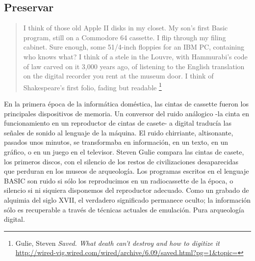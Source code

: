\documentclass[12pt, a4paper,twoside]{book}
\begin{document}
\subsection{Preservar}

\begin{quote}
I think of those old Apple II disks in my closet. My son's first
Basic program, still on a Commodore 64 cassette. I flip through my
filing cabinet. Sure enough, some 51/4-inch floppies for an IBM PC,
containing who knows what? I think of a stele in the Louvre, with
Hammurabi's code of law carved on it 3,000 years ago, of listening
to the English translation on the digital recorder you rent at the
museum door. I think of Shakespeare's first folio, fading but
readable%
\footnote{Gulie, Steven
\emph{Saved. What death can't destroy and how to digitize it}
\href{http://wired-vig.wired.com/wired/archive/6.09/saved.html?pg=1&topic=}{http://wired-vig.wired.com/wired/archive/6.09/saved.html?pg=1\&topic=}}

\end{quote}
En la primera época de la informática doméstica, las cintas de
cassette fueron los principales dispositivos de memoria. Un
conversor del ruido análogico -la cinta en funcionamiento en un
reproductor de cintas de casete- a digital traducía las señales de
sonido al lenguaje de la máquina. El ruido chirriante, altisonante,
pasados unos minutos, se transformaba en información, en un texto,
en un gráfico, o en un juego en el televisor. Steven Gulie compara
las cintas de casete, los primeros discos, con el silencio de los
restos de civilizaciones desaparecidas que perduran en los museos
de arqueología. Los programas escritos en el lenguaje BASIC son
ruido si sólo los reproducimos en un radiocassette de la época, o
silencio si ni siquiera disponemos del reproductor adecuado. Como
un grabado de alquimia del siglo XVII, el verdadero significado
permanece oculto; la información sólo es recuperable a través de
técnicas actuales de emulación. Pura arqueología digital.
\end{document}
